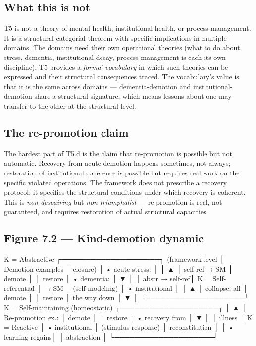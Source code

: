 \documentclass[11pt, openany]{book}
\begin{document}
\subsection{What this is not}

T5 is not a theory of mental health, institutional health, or process management. It is a structural-categorial theorem with specific implications in multiple domains. The domains need their own operational theories (what to do about stress, dementia, institutional decay, process management is each its own discipline). T5 provides a \textit{formal vocabulary} in which such theories can be expressed and their structural consequences traced. The vocabulary's value is that it is the same across domains --- dementia-demotion and institutional-demotion share a structural signature, which means lessons about one may transfer to the other at the structural level.

\subsection{The re-promotion claim}

The hardest part of T5.d is the claim that re-promotion is possible but not automatic. Recovery from acute demotion happens sometimes, not always; restoration of institutional coherence is possible but requires real work on the specific violated operations. The framework does not prescribe a recovery protocol; it specifies the structural conditions under which recovery is coherent. This is \textit{non-despairing} but \textit{non-triumphalist} --- re-promotion is real, not guaranteed, and requires restoration of actual structural capacities.

\subsection{Figure 7.2 --- Kind-demotion dynamic}

\begin{Code}
  K = Abstractive         ┌────────────────────┐
  (framework-level        │  Demotion examples │
   closure)               │  • acute stress:   │
         │ ▲              │    self-ref → SM   │
  demote │ │ restore      │  • dementia:       │
         ▼ │              │    abstr → self-ref│
  K = Self-referential    │    → SM            │
  (self-modeling)         │  • institutional   │
         │ ▲              │    collapse: all   │
  demote │ │ restore      │    the way down    │
         ▼ │              └────────────────────┘
  K = Self-maintaining
  (homeostatic)           ┌────────────────────┐
         │ ▲              │ Re-promotion ex.:  │
  demote │ │ restore      │  • recovery from   │
         ▼ │              │    illness         │
  K = Reactive            │  • institutional   │
  (stimulus-response)     │    reconstitution  │
                          │  • learning regains│
                          │    abstraction     │
                          └────────────────────┘
\end{Code}
\end{document}
